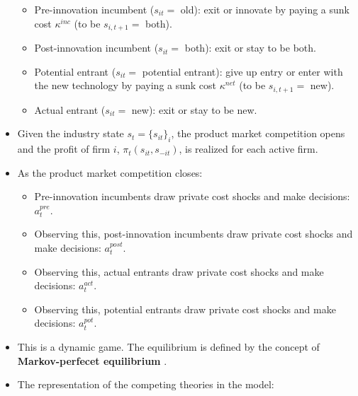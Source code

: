 \documentclass[]{book}
\providecommand{\tightlist}{%
  \setlength{\itemsep}{0pt}\setlength{\parskip}{0pt}}
\theoremstyle{definition}
\theoremstyle{definition}
\theoremstyle{definition}
\theoremstyle{remark}
\begin{document}
\begin{itemize}
  \begin{itemize}
  \tightlist
  \item
    Pre-innovation incumbent (\(s_{it} =\) old): exit or innovate by
    paying a sunk cost \(\kappa^{inc}\) (to be \(s_{i, t + 1} =\) both).
  \item
    Post-innovation incumbent (\(s_{it} =\) both): exit or stay to be
    both.
  \item
    Potential entrant (\(s_{it} =\) potential entrant): give up entry or
    enter with the new technology by paying a sunk cost \(\kappa^{net}\)
    (to be \(s_{i, t + 1} =\) new).
  \item
    Actual entrant (\(s_{it} =\) new): exit or stay to be new.
  \end{itemize}
\item
  Given the industry state \(s_t = \{s_{it}\}_i\), the product market
  competition opens and the profit of firm \(i\),
  \(\pi_t(s_{it}, s_{-it})\), is realized for each active firm.
\item
  As the product market competition closes:

  \begin{itemize}
  \tightlist
  \item
    Pre-innovation incumbents draw private cost shocks and make
    decisions: \(a_t^{pre}\).
  \item
    Observing this, post-innovation incumbents draw private cost shocks
    and make decisions: \(a_t^{post}\).
  \item
    Observing this, actual entrants draw private cost shocks and make
    decisions: \(a_t^{act}\).
  \item
    Observing this, potential entrants draw private cost shocks and make
    decisions: \(a_t^{pot}\).
  \end{itemize}
\item
  This is a dynamic game. The equilibrium is defined by the concept of
  \textbf{Markov-perfecet equilibrium} \citep{Maskin1988}.
\item
  The representation of the competing theories in the model:


\end{itemize}
\end{document}
